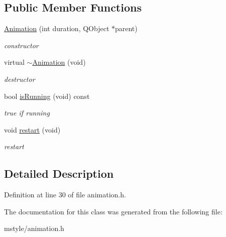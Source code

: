 \subsection*{Public Member Functions}
\begin{DoxyCompactItemize}
\item 
\mbox{\label{class_animation_a293241b23ab28a625dbc66dbc286a6a7}} 
\hyperlink{class_animation_a293241b23ab28a625dbc66dbc286a6a7}{Animation} (int duration, Q\+Object $\ast$parent)
\begin{DoxyCompactList}\small\item\em constructor \end{DoxyCompactList}\item 
\mbox{\label{class_animation_aa37aebced80251c0364c1c199a68ab41}} 
virtual \hyperlink{class_animation_aa37aebced80251c0364c1c199a68ab41}{$\sim$\+Animation} (void)
\begin{DoxyCompactList}\small\item\em destructor \end{DoxyCompactList}\item 
\mbox{\label{class_animation_ab281c13068313a55d95d62f983341765}} 
bool \hyperlink{class_animation_ab281c13068313a55d95d62f983341765}{is\+Running} (void) const
\begin{DoxyCompactList}\small\item\em true if running \end{DoxyCompactList}\item 
\mbox{\label{class_animation_ab826f316e3cb390c9ef3d5b5f564c61a}} 
void \hyperlink{class_animation_ab826f316e3cb390c9ef3d5b5f564c61a}{restart} (void)
\begin{DoxyCompactList}\small\item\em restart \end{DoxyCompactList}\end{DoxyCompactItemize}


\subsection{Detailed Description}


Definition at line 30 of file animation.\+h.



The documentation for this class was generated from the following file\+:\begin{DoxyCompactItemize}
\item 
mstyle/animation.\+h\end{DoxyCompactItemize}
